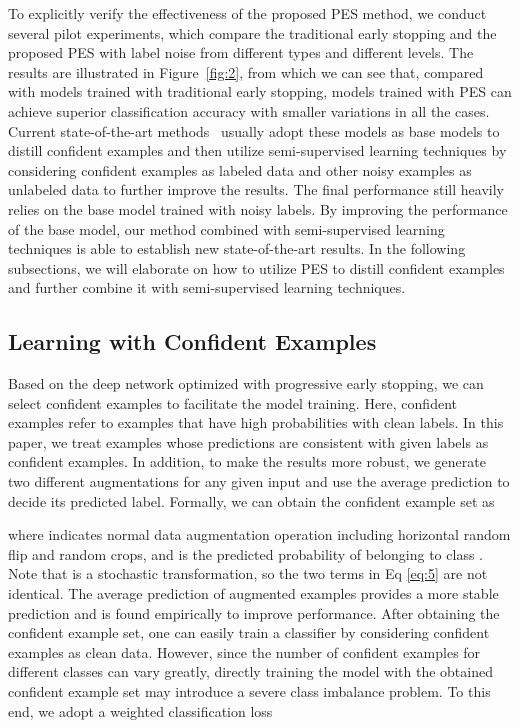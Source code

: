 \documentclass[11pt]{article}
\begin{document}
To explicitly verify the effectiveness of the proposed PES method, we conduct several pilot experiments, which compare the traditional early stopping and the proposed PES with label noise from different types and different levels. The results are illustrated in Figure~\ref{fig:2}, from which we can see that, compared with models trained with traditional early stopping,  models trained with PES can achieve superior classification accuracy with smaller variations in all the cases. Current state-of-the-art methods~\cite{Li2020DivideMix} usually adopt these models as base models to distill confident examples and then utilize semi-supervised learning techniques by considering confident examples as labeled data and other noisy examples as unlabeled data to further improve the results. The final performance still heavily relies on the base model trained with noisy labels. By improving the performance of the base model, our method combined with semi-supervised learning techniques is able to establish new state-of-the-art results. In the following subsections, we will elaborate on how to utilize PES to distill confident examples and further combine it with semi-supervised learning techniques.

\subsection{Learning with Confident Examples}
Based on the deep network optimized with progressive early stopping, we can select confident examples to facilitate the model training. Here, confident examples refer to examples that have high probabilities with clean labels. In this paper, we treat examples whose predictions are consistent with given labels as confident examples. In addition, to make the results more robust,  we generate two different augmentations for any given input and use the average prediction to decide its predicted label.  Formally, we can obtain the confident example set  as




where  indicates normal data augmentation operation including horizontal random flip and random crops, and  is the predicted probability of  belonging to class . Note that  is a stochastic transformation, so the two terms in Eq \eqref{eq:5} are not identical. The average prediction of augmented examples provides a more stable prediction and is found empirically to improve performance. After obtaining the confident example set, one can easily train a classifier by considering confident examples as clean data. However, since the number of confident examples for different classes can vary greatly, directly training the model with the obtained confident example set may introduce a severe class imbalance problem. To this end, we adopt a weighted classification loss
\end{document}

